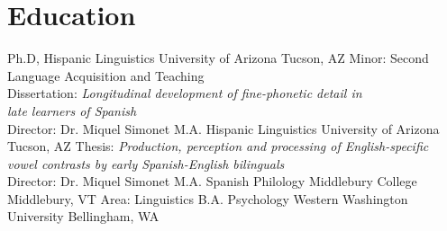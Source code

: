 
\section{Education}

        {Ph.D, Hispanic Linguistics}
        {}
        {University of Arizona}
        {Tucson, AZ}
        {Minor: Second Language Acquisition and Teaching \\
         Dissertation: \emph{Longitudinal development of fine-phonetic detail 
         in \\
         late learners of Spanish} \\ 
         Director: Dr. Miquel Simonet}
        {M.A.}
        {Hispanic Linguistics}
        {University of Arizona}
        {Tucson, AZ}
        {Thesis: \emph{Production, perception and processing of 
        English-specific \\
        vowel contrasts by early Spanish-English bilinguals} \\ 
        Director: Dr. Miquel Simonet}
        {M.A.}
        {Spanish Philology}
        {Middlebury College}
        {Middlebury, VT}
        {Area: Linguistics}
        {B.A.}
        {Psychology}
        {Western Washington University}
        {Bellingham, WA}
        {}

